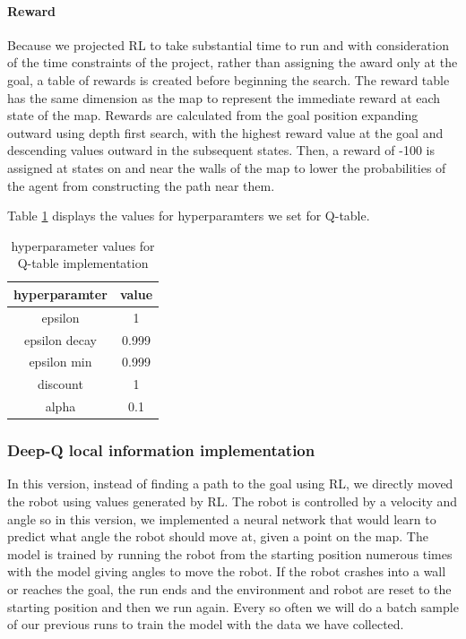 \documentclass[11pt]{article}
\begin{document}
            \paragraph{Reward} 
            Because we projected RL to take substantial time to run and with
            consideration of the time constraints of the project, rather than
            assigning the award only at the goal, a table of rewards is created
            before beginning the search. The reward table has the same dimension
            as the map to represent the immediate reward at each state of the
            map. Rewards are calculated from the goal position expanding outward
            using depth first search, with the highest reward value at the goal
            and descending values outward in the subsequent states. Then, a
            reward of -100 is assigned at states on and near the walls of the
            map to lower the probabilities of the agent from constructing the
            path near them. 

            Table \ref{table:1} displays the values for hyperparamters we set
            for Q-table.

            \begin{table}[h!]
                \centering
                \begin{tabular}{|c c|} 
                \hline
                hyperparamter & value  \\ [0.5ex] 
                \hline
                epsilon & 1 \\
                epsilon decay & 0.999 \\
                epsilon min & 0.999 \\
                discount & 1 \\ 
                alpha & 0.1 \\ [1ex] 
                \hline
                \end{tabular}
                \caption{hyperparameter values for Q-table implementation}
                \label{table:1}
            \end{table}
        
        \subsubsection{Deep-Q local information implementation}

        In this version, instead of finding a path to the goal using RL, we
        directly moved the robot using values generated by RL. The robot is
        controlled by a velocity and angle so in this version, we implemented a
        neural network that would learn to predict what angle the robot should
        move at, given a point on the map. The model is trained by running the
        robot from the starting position numerous times with the model giving
        angles to move the robot. If the robot crashes into a wall or reaches
        the goal, the run ends and the environment and robot are reset to the
        starting position and then we run again. Every so often we will do a
        batch sample of our previous runs to train the model with the data we
        have collected. 
\end{document}
